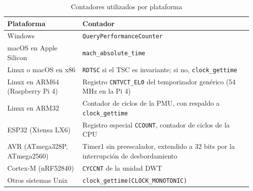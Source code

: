 \begin{table}[H]
\centering
\caption{Contadores utilizados por plataforma}
\label{tab:temporizadores}
\begin{tabularx}{\textwidth}{@{}L{0.30\textwidth}Y@{}}
\toprule
\textbf{Plataforma} & \textbf{Contador} \\
\midrule
Windows & \texttt{QueryPerformanceCounter} \\
macOS en Apple Silicon & \texttt{mach\_absolute\_time} \\
Linux o macOS en x86 & \texttt{RDTSC} si el TSC es invariante; si no, \texttt{clock\_gettime} \\
Linux en ARM64 (Raspberry Pi 4) & Registro \texttt{CNTVCT\_EL0} del temporizador genérico (54 MHz en la Pi 4) \\
Linux en ARM32 & Contador de ciclos de la PMU, con respaldo a \texttt{clock\_gettime} \\
ESP32 (Xtensa LX6) & Registro especial \texttt{CCOUNT}, contador de ciclos de la CPU \\
AVR (ATmega328P, ATmega2560) & Timer1 sin preescalador, extendido a 32 bits por la interrupción de desbordamiento \\
Cortex-M (nRF52840) & \texttt{CYCCNT} de la unidad DWT \\
Otros sistemas Unix & \texttt{clock\_gettime(CLOCK\_MONOTONIC)} \\
\bottomrule
\end{tabularx}
\end{table}

